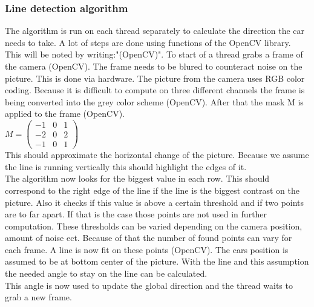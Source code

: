 \subsubsection{Line detection algorithm}
The algorithm is run on each thread separately to calculate the direction the car needs to take. A lot of steps are done using functions of the OpenCV library. This will be noted by writing:"(OpenCV)". To start of a thread grabs a frame of the camera (OpenCV). The frame needs to be blured to counteract noise on the picture. This is done via hardware. The picture from the camera uses RGB color coding. Because it is difficult to compute on three different channels the frame is being converted into the grey color scheme (OpenCV). After that the mask M is applied to the frame (OpenCV).\\
$M =
\begin{pmatrix}
-1 & 0 & 1\\
-2 & 0 & 2\\
-1 & 0 & 1
\end{pmatrix}
$\\
This should approximate the horizontal change of the picture. Because we assume the line is running vertically this should highlight the edges of it.\\
The algorithm now looks for the biggest value in each row. This should correspond to the right edge of the line if the line is the biggest contrast on the picture. Also it checks if this value is above a certain threshold and if two points are to far apart. If that is the case those points are not used in further computation. These thresholds can be varied depending on the camera position, amount of noise ect. Because of that the number of found points can vary for each frame. A line is now fit on these points (OpenCV). The cars position is assumed to be at bottom center of the picture. With the line and this assumption the needed angle to stay on the line can be calculated.\\
This angle is now used to update the global direction and the thread waits to grab a new frame.

